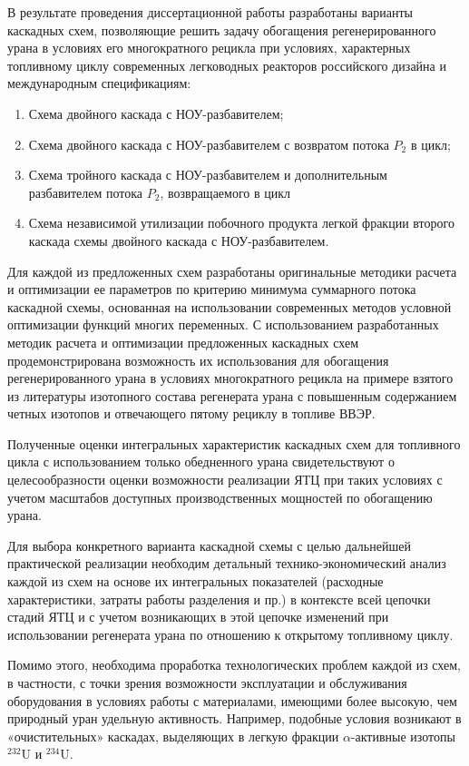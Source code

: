 В результате проведения диссертационной работы разработаны варианты каскадных схем, позволяющие решить задачу обогащения регенерированного урана в условиях его многократного рецикла при условиях, характерных топливному циклу современных легководных реакторов российского дизайна и международным спецификациям:

\begin{enumerate}
  \item Схема двойного каскада с НОУ-разбавителем;
  \item Схема двойного каскада с НОУ-разбавителем с возвратом потока $P_2$ в цикл;
  \item Схема тройного каскада с НОУ-разбавителем и дополнительным разбавителем потока $P_2$, возвращаемого в цикл
  \item Схема независимой утилизации побочного продукта легкой фракции второго каскада схемы двойного каскада с НОУ-разбавителем.
\end{enumerate}

Для каждой из предложенных схем разработаны оригинальные методики расчета и оптимизации ее параметров по критерию минимума суммарного потока каскадной схемы, основанная на использовании современных методов условной оптимизации функций многих переменных. С использованием разработанных методик расчета и оптимизации предложенных каскадных схем продемонстрирована возможность их использования для обогащения регенерированного урана в условиях многократного рецикла на примере взятого из литературы изотопного состава регенерата урана с повышенным содержанием четных изотопов и отвечающего пятому рециклу в топливе ВВЭР.

Полученные оценки интегральных характеристик каскадных схем для топливного цикла с использованием только обедненного урана свидетельствуют о целесообразности оценки возможности реализации ЯТЦ при таких условиях с учетом масштабов доступных производственных мощностей по обогащению урана.

Для выбора конкретного варианта каскадной схемы с целью дальнейшей практической реализации необходим детальный технико-экономический анализ каждой из схем на основе их интегральных показателей (расходные характеристики, затраты работы разделения и пр.) в контексте всей цепочки стадий ЯТЦ и с учетом возникающих в этой цепочке изменений при использовании регенерата урана по отношению к открытому топливному циклу. 

Помимо этого, необходима проработка технологических проблем каждой из схем, в частности, с точки зрения возможности эксплуатации и обслуживания оборудования в условиях работы с материалами, имеющими более высокую, чем природный уран удельную активность. Например, подобные условия возникают в «очистительных» каскадах, выделяющих в легкую фракции $\alpha$-активные изотопы $^{232}$U и $^{234}$U. 



